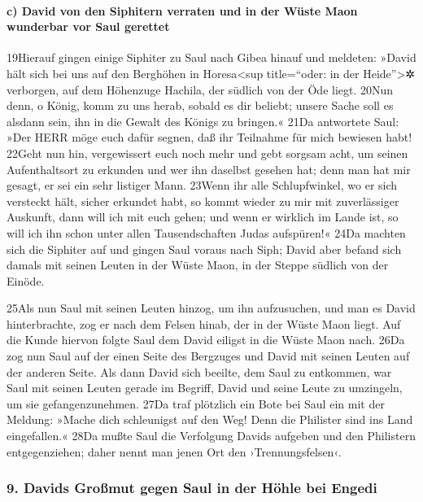 \hypertarget{c-david-von-den-siphitern-verraten-und-in-der-wuxfcste-maon-wunderbar-vor-saul-gerettet}{%
\paragraph{c) David von den Siphitern verraten und in der Wüste Maon
wunderbar vor Saul
gerettet}\label{c-david-von-den-siphitern-verraten-und-in-der-wuxfcste-maon-wunderbar-vor-saul-gerettet}}

19Hierauf gingen einige Siphiter zu Saul nach Gibea hinauf und meldeten:
»David hält sich bei uns auf den Berghöhen in Horesa\textless sup
title=``oder: in der Heide''\textgreater✲ verborgen, auf dem Höhenzuge
Hachila, der südlich von der Öde liegt. 20Nun denn, o König, komm zu uns
herab, sobald es dir beliebt; unsere Sache soll es alsdann sein, ihn in
die Gewalt des Königs zu bringen.« 21Da antwortete Saul: »Der HERR möge
euch dafür segnen, daß ihr Teilnahme für mich bewiesen habt! 22Geht nun
hin, vergewissert euch noch mehr und gebt sorgsam acht, um seinen
Aufenthaltsort zu erkunden und wer ihn daselbst gesehen hat; denn man
hat mir gesagt, er sei ein sehr listiger Mann. 23Wenn ihr alle
Schlupfwinkel, wo er sich versteckt hält, sicher erkundet habt, so kommt
wieder zu mir mit zuverlässiger Auskunft, dann will ich mit euch gehen;
und wenn er wirklich im Lande ist, so will ich ihn schon unter allen
Tausendschaften Judas aufspüren!« 24Da machten sich die Siphiter auf und
gingen Saul voraus nach Siph; David aber befand sich damals mit seinen
Leuten in der Wüste Maon, in der Steppe südlich von der Einöde.

25Als nun Saul mit seinen Leuten hinzog, um ihn aufzusuchen, und man es
David hinterbrachte, zog er nach dem Felsen hinab, der in der Wüste Maon
liegt. Auf die Kunde hiervon folgte Saul dem David eiligst in die Wüste
Maon nach. 26Da zog nun Saul auf der einen Seite des Bergzuges und David
mit seinen Leuten auf der anderen Seite. Als dann David sich beeilte,
dem Saul zu entkommen, war Saul mit seinen Leuten gerade im Begriff,
David und seine Leute zu umzingeln, um sie gefangenzunehmen. 27Da traf
plötzlich ein Bote bei Saul ein mit der Meldung: »Mache dich schleunigst
auf den Weg! Denn die Philister sind ins Land eingefallen.« 28Da mußte
Saul die Verfolgung Davids aufgeben und den Philistern entgegenziehen;
daher nennt man jenen Ort den ›Trennungsfelsen‹.

\hypertarget{davids-grouxdfmut-gegen-saul-in-der-huxf6hle-bei-engedi}{%
\subsubsection{9. Davids Großmut gegen Saul in der Höhle bei
Engedi}\label{davids-grouxdfmut-gegen-saul-in-der-huxf6hle-bei-engedi}}

